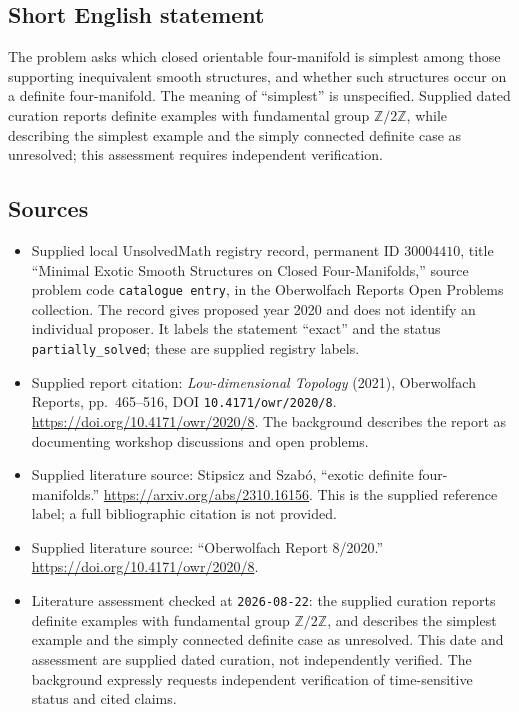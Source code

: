 \documentclass[11pt]{article}
\newcommand{\Z}{\mathbb{Z}}
\begin{document}
\subsection{Short English statement}
The problem asks which closed orientable four-manifold is simplest among those supporting inequivalent smooth structures, and whether such structures occur on a definite four-manifold. The meaning of ``simplest'' is unspecified. Supplied dated curation reports definite examples with fundamental group \(\Z/2\Z\), while describing the simplest example and the simply connected definite case as unresolved; this assessment requires independent verification.
\subsection{Sources}
\begin{itemize}
\item Supplied local UnsolvedMath registry record, permanent ID \(30004410\), title ``Minimal Exotic Smooth Structures on Closed Four-Manifolds,'' source problem code \texttt{catalogue entry}, in the Oberwolfach Reports Open Problems collection. The record gives proposed year 2020 and does not identify an individual proposer. It labels the statement ``exact'' and the status \texttt{partially\_solved}; these are supplied registry labels.
\item Supplied report citation: \emph{Low-dimensional Topology} (2021), Oberwolfach Reports, pp.\ 465--516, DOI \texttt{10.4171/owr/2020/8}. \url{https://doi.org/10.4171/owr/2020/8}. The background describes the report as documenting workshop discussions and open problems.
\item Supplied literature source: Stipsicz and Szab\'o, ``exotic definite four-manifolds.'' \url{https://arxiv.org/abs/2310.16156}. This is the supplied reference label; a full bibliographic citation is not provided.
\item Supplied literature source: ``Oberwolfach Report 8/2020.'' \url{https://doi.org/10.4171/owr/2020/8}.
\item Literature assessment checked at \texttt{2026-08-22}: the supplied curation reports definite examples with fundamental group \(\Z/2\Z\), and describes the simplest example and the simply connected definite case as unresolved. This date and assessment are supplied dated curation, not independently verified. The background expressly requests independent verification of time-sensitive status and cited claims.
\end{itemize}
\end{document}
